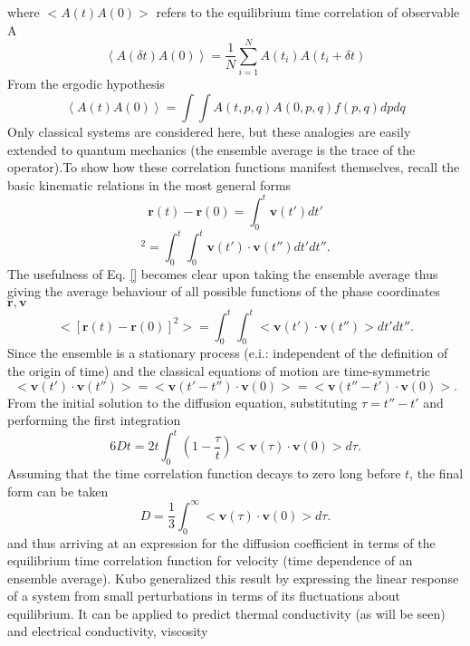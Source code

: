 where $<A(t)A(0)>$ refers to the equilibrium time correlation of observable A
\begin{equation}
\left<A(\delta t)A(0)\right>=\frac{1}{N}\sum_{i=1}^NA(t_i)A(t_i+\delta t) 
\end{equation}
From the ergodic hypothesis
\begin{equation}
\left<A( t)A(0)\right>=\int \int A(t,p,q)A(0,p,q) f(p,q) dpdq 
\end{equation}
Only classical systems are considered here, but these analogies are easily extended to quantum mechanics (the ensemble average is the trace of the operator).To show how these correlation functions manifest themselves, recall the basic kinematic relations in the most general forms
%
\begin{equation}
\bm{r}(t)-\bm{r}(0)=\int_0^t \bm{v}(t')dt'
\end{equation}
\begin{equation}
[\bm{r}(t)-\bm{r}(0)]^2=\int_0^t \int_0^t \bm{v}(t')\cdot\bm{v}(t'')dt'dt''.
\end{equation}
%
The usefulness of Eq. \ref {} becomes clear upon taking the ensemble average thus giving the average behaviour of all possible functions of the phase coordinates $\bm{r},\bm{v}$
%
\begin{equation}
<[\bm{r}(t)-\bm{r}(0)]^2>=\int_0^t \int_0^t <\bm{v}(t')\cdot\bm{v}(t'')>dt'dt''.
\end{equation}
%
Since the ensemble is a stationary process (e.i.: independent of the definition of the origin of time) and the classical equations of motion are time-symmetric
%
\begin{equation}
<\bm{v}(t')\cdot\bm{v}(t'')>=<\bm{v}(t'-t'')\cdot\bm{v}(0)>=<\bm{v}(t''-t')\cdot\bm{v}(0)>.
\end{equation}
%
From the initial solution to the diffusion equation, substituting $\tau=t''-t'$ and performing the first integration
%
\begin{equation}
6Dt=2t\int_0^t\left(1-\frac{\tau}{t}\right)<\bm{v}(\tau)\cdot\bm{v}(0)>d\tau.
\end{equation}
%
Assuming that the time correlation function decays to zero long before $t$, the final form can be taken
%
\begin{equation}
D=\frac{1}{3}\int_0^{\infty}<\bm{v}(\tau)\cdot\bm{v}(0)>d\tau.
\end{equation}
%
and thus arriving at an expression for the diffusion coefficient in terms of the equilibrium time correlation function for velocity (time dependence of an ensemble average). Kubo generalized this result by expressing the linear response of a system from small perturbations in terms of its fluctuations about equilibrium. It can be applied to predict thermal conductivity (as will be seen)\cite{} and electrical conductivity, \cite{} viscosity \cite{}

